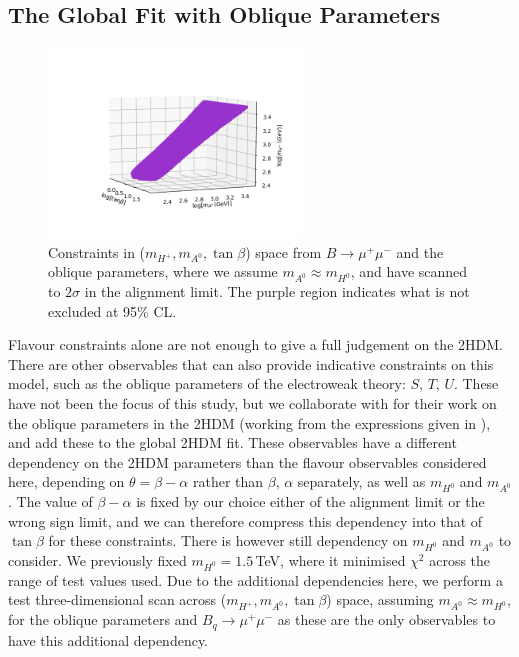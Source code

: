 \documentclass[a4paper,12pt]{article}
\begin{document}
\subsection{The Global Fit with Oblique Parameters}
\label{subsec:oblique}
\begin{figure}[ht]
    \centering
    \includegraphics[width=0.6\textwidth,trim=6em 3em 10pt 6em,clip]{../global/threedimfit1.png}
    \caption{\label{fig:threed}Constraints in ($m_{H^+},m_{A^0},\tan\beta$) space from $B\to\mu^+\mu^-$ and the oblique parameters, where we assume $m_{A^0}\approx m_{H^0}$, and have scanned to $2\sigma$ in the alignment limit.
    The purple region indicates what is not excluded at 95\% CL.}
\end{figure}
Flavour constraints alone are not enough to give a full judgement on the 2HDM. 
There are other observables that can also provide indicative constraints on this model, such as the oblique parameters of the electroweak theory: $S$, $T$, $U$. 
These have not been the focus of this study, but we collaborate with \cite{james} for their work on the oblique parameters in the 2HDM (working from the expressions given in \cite{oblique,hunter}), and add these to the global 2HDM fit. 
These observables have a different dependency on the 2HDM parameters than the flavour observables considered here, depending on $\theta=\beta-\alpha$ rather than $\beta$, $\alpha$ separately, as well as $m_{H^0}$ and $m_{A^0}$. 
The value of $\beta-\alpha$ is fixed by our choice either of the alignment limit or the wrong sign limit, and we can therefore compress this dependency into that of $\tan\beta$ for these constraints. 
There is however still dependency on $m_{H^0}$ and $m_{A^0}$ to consider.
We previously fixed $m_{H^0}=1.5\,$TeV, where it minimised $\chi^2$ across the range of test values used. 
Due to the additional dependencies here, we perform a test three-dimensional scan across ($m_{H^+},m_{A^0},\tan\beta$) space, assuming $m_{A^0}\approx m_{H^0}$, for the oblique parameters and $B_q\to\mu^+\mu^-$ as these are the only observables to have this additional dependency. 
\end{document}
